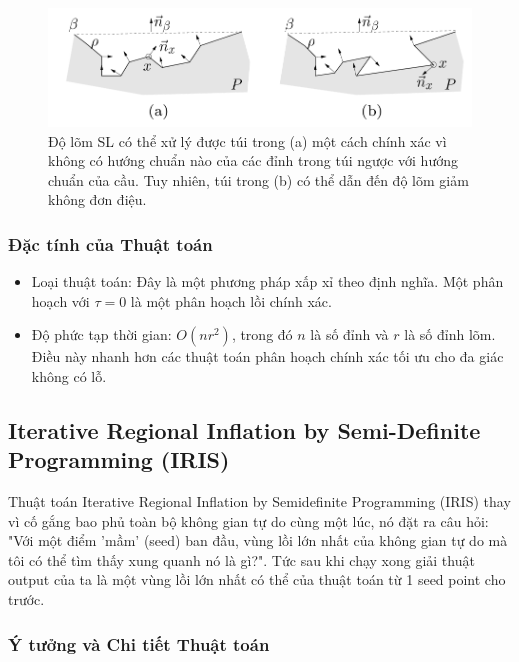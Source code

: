 \documentclass{article}
\begin{document}
\begin{itemize}
    \begin{figure}[H]
        \centering
        \includegraphics[width=0.5\linewidth]{imgs/ACD-6.png}
        \caption{Độ lõm SL có thể xử lý được túi trong (a) một cách chính xác vì không có hướng chuẩn nào của các đỉnh trong túi ngược với hướng chuẩn của cầu. Tuy nhiên, túi trong (b) có thể dẫn đến độ lõm giảm không đơn điệu.}
    \end{figure}
   
\end{itemize}

\subsubsection{Đặc tính của Thuật toán}

\begin{itemize}
\item Loại thuật toán: Đây là một phương pháp xấp xỉ theo định nghĩa. Một phân hoạch với $\tau=0$ là một phân hoạch lồi chính xác.
\item Độ phức tạp thời gian: $O(n r^2)$, trong đó $n$ là số đỉnh và $r$ là số đỉnh lõm.\cite{lien2006} Điều này nhanh hơn các thuật toán phân hoạch chính xác tối ưu cho đa giác không có lỗ.
\end{itemize}



\subsection{Iterative Regional Inflation by Semi-Definite Programming (IRIS)}

Thuật toán Iterative Regional Inflation by Semidefinite Programming (IRIS) thay vì cố gắng bao phủ toàn bộ không gian tự do cùng một lúc, nó đặt ra câu hỏi: "Với một điểm 'mầm' (seed) ban đầu, vùng lồi lớn nhất của không gian tự do mà tôi có thể tìm thấy xung quanh nó là gì?".  Tức sau khi chạy xong giải thuật output của ta là một vùng lồi lớn nhất có thể của thuật toán từ 1 seed point cho trước.

\subsubsection{Ý tưởng và Chi tiết Thuật toán}
\end{document}
